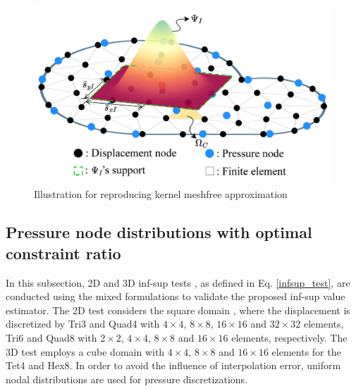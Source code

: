 \begin{figure}[H]
\centering
\includegraphics[width=\textwidth]{png/mix.png}
\caption{Illustration for reproducing kernel meshfree approximation}\label{fg:rk_approximation}
\end{figure}

\subsection{Pressure node distributions with optimal constraint ratio}\DIFaddbegin \label{subsec:optimal_constraint_ratio}
\DIFaddend 

In this subsection, 2D and 3D inf-sup tests \cite{chapelle1993}, as defined in Eq. \ref{infsup_test}, are conducted using the mixed  \DIFaddbegin {}\DIFaddend formulations to validate the proposed inf-sup value estimator.
The 2D test considers the square domain  \DIFaddbegin {}\DIFaddend , where the displacement is discretized by Tri3 and Quad4 with $4\times 4$, $8\times 8$, $16\times 16$ and $32\times 32$ elements, Tri6 and Quad8 with $2\times 2$, $4\times 4$, $8\times 8$ and $16\times 16$ elements, respectively. The 3D test employs a cube domain  \DIFaddbegin {}\DIFaddend with $4\times 4$, $8\times 8$ and $16\times 16$ elements for the Tet4 and Hex8.
\DIFaddbegin {}\DIFaddend In order to avoid the influence of interpolation error, uniform nodal distributions are used for pressure discretizations\DIFaddbegin {}\DIFaddend .


